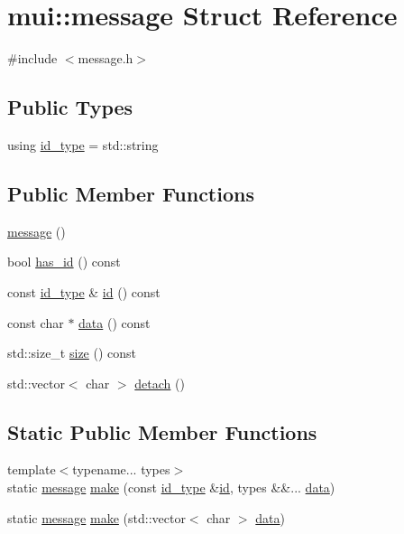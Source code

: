 \hypertarget{structmui_1_1message}{}\section{mui\+:\+:message Struct Reference}
\label{structmui_1_1message}


{\ttfamily \#include $<$message.\+h$>$}

\subsection*{Public Types}
\begin{DoxyCompactItemize}
\item 
using \hyperlink{structmui_1_1message_aecbd0ac37983ce799121a1d78d97a9c1}{id\+\_\+type} = std\+::string
\end{DoxyCompactItemize}
\subsection*{Public Member Functions}
\begin{DoxyCompactItemize}
\item 
\hyperlink{structmui_1_1message_ada5eb3ee6f884e50de90361a9dd2005a}{message} ()
\item 
bool \hyperlink{structmui_1_1message_a7c5987da00691f40c4b4b6eaf979e19e}{has\+\_\+id} () const
\item 
const \hyperlink{structmui_1_1message_aecbd0ac37983ce799121a1d78d97a9c1}{id\+\_\+type} \& \hyperlink{structmui_1_1message_a15b328d568653630c8665c1d0135cbd7}{id} () const
\item 
const char $\ast$ \hyperlink{structmui_1_1message_a8fb9fd5730cb451cc20182b736ba1bfc}{data} () const
\item 
std\+::size\+\_\+t \hyperlink{structmui_1_1message_a5cf6b0eeddeea86664e9a2f17f41a872}{size} () const
\item 
std\+::vector$<$ char $>$ \hyperlink{structmui_1_1message_a91eb72d60f7eeb165a83b9c42a898ec5}{detach} ()
\end{DoxyCompactItemize}
\subsection*{Static Public Member Functions}
\begin{DoxyCompactItemize}
\item 
{\footnotesize template$<$typename... types$>$ }\\static \hyperlink{structmui_1_1message}{message} \hyperlink{structmui_1_1message_ab75db40598b84930d88eadcefa3ae94f}{make} (const \hyperlink{structmui_1_1message_aecbd0ac37983ce799121a1d78d97a9c1}{id\+\_\+type} \&\hyperlink{structmui_1_1message_a15b328d568653630c8665c1d0135cbd7}{id}, types \&\&... \hyperlink{structmui_1_1message_a8fb9fd5730cb451cc20182b736ba1bfc}{data})
\item 
static \hyperlink{structmui_1_1message}{message} \hyperlink{structmui_1_1message_a2d47197a74abcedc0c035d5190084050}{make} (std\+::vector$<$ char $>$ \hyperlink{structmui_1_1message_a8fb9fd5730cb451cc20182b736ba1bfc}{data})
\end{DoxyCompactItemize}
